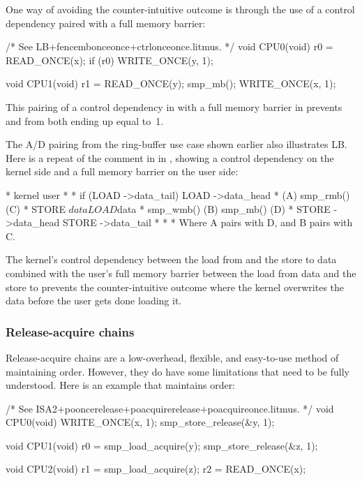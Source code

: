 One way of avoiding the counter-intuitive outcome is through the use of a
control dependency paired with a full memory barrier:

\begin{VerbatimU}
	/* See LB+fencembonceonce+ctrlonceonce.litmus. */
	void CPU0(void)
	{
		r0 = READ_ONCE(x);
		if (r0)
			WRITE_ONCE(y, 1);
	}

	void CPU1(void)
	{
		r1 = READ_ONCE(y);
		smp_mb();
		WRITE_ONCE(x, 1);
	}
\end{VerbatimU}

This pairing of a control dependency in  with a full memory
barrier in  prevents  and  from both ending up
equal to~1.

The A/D pairing from the ring-buffer use case shown earlier also
illustrates LB.  Here is a repeat of the comment in
 in ,
showing a control dependency on the kernel side and a full memory barrier on
the user side:

\begin{VerbatimU}
	 *   kernel                             user
	 *
	 *   if (LOAD ->data_tail) {            LOAD ->data_head
	 *                      (A)             smp_rmb()       (C)
	 *      STORE $data                     LOAD $data
	 *      smp_wmb()       (B)             smp_mb()        (D)
	 *      STORE ->data_head               STORE ->data_tail
	 *   }
	 *
	 * Where A pairs with D, and B pairs with C.
\end{VerbatimU}

The kernel's control dependency between the load from 
and the store to data combined with the user's full memory barrier
between the load from data and the store to  prevents
the counter-intuitive outcome where the kernel overwrites the data
before the user gets done loading it.


\subsubsection{Release-acquire chains}

Release-acquire chains are a low-overhead, flexible, and easy-to-use
method of maintaining order.
However, they do have some limitations that need to be fully understood.
Here is an example that maintains order:

\begin{VerbatimU}
	/* See ISA2+pooncerelease+poacquirerelease+poacquireonce.litmus. */
	void CPU0(void)
	{
		WRITE_ONCE(x, 1);
		smp_store_release(&y, 1);
	}

	void CPU1(void)
	{
		r0 = smp_load_acquire(y);
		smp_store_release(&z, 1);
	}

	void CPU2(void)
	{
		r1 = smp_load_acquire(z);
		r2 = READ_ONCE(x);
	}
\end{VerbatimU}

